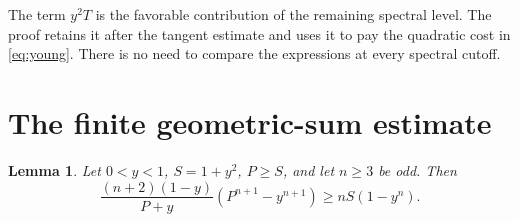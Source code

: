 \documentclass[11pt]{article}
\newtheorem{lemma}[theorem]{Lemma}
\theoremstyle{remark}
\begin{document}
The term $y^2T$ is the favorable contribution of the remaining spectral level. The proof retains it after the tangent estimate and uses it to pay the quadratic cost in \eqref{eq:young}. There is no need to compare the expressions at every spectral cutoff.

\section{The finite geometric-sum estimate}

\begin{lemma}\label{lem:geometric}
Let $0<y<1$, $S=1+y^2$, $P\ge S$, and let $n\ge3$ be odd. Then
\begin{equation}\label{eq:beta-bound}
 \frac{(n+2)(1-y)}{P+y}(P^{n+1}-y^{n+1})
 \ge nS(1-y^n).
\end{equation}
\end{lemma}
\end{document}

